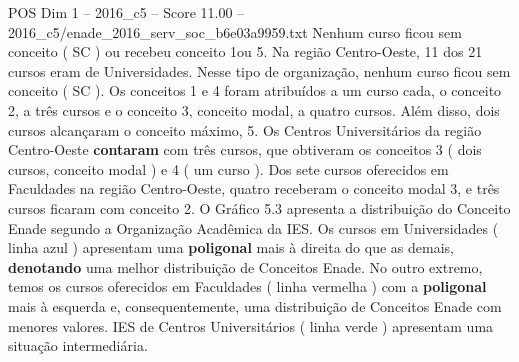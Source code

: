 \begin{textsample}{POS Dim 1 – 2016\_c5 – Score 11.00 – 2016\_c5/enade\_2016\_serv\_soc\_b6e03a9959.txt}
Nenhum curso ficou sem conceito ( SC ) ou recebeu conceito 1ou 5.
Na região Centro-Oeste, 11 dos 21 cursos eram de Universidades.
Nesse tipo de organização, nenhum curso ficou sem conceito ( SC ).
Os conceitos 1 e 4 foram atribuídos a um curso cada, o conceito 2, a três cursos e o conceito 3, conceito modal, a quatro cursos.
Além disso, dois cursos alcançaram o conceito máximo, 5.
Os Centros Universitários da região Centro-Oeste \textbf{contaram} com três cursos, que obtiveram os conceitos 3 ( dois cursos, conceito modal ) e 4 ( um curso ).
Dos sete cursos oferecidos em Faculdades na região Centro-Oeste, quatro receberam o conceito modal 3, e três cursos ficaram com conceito 2.
O Gráfico 5.3 apresenta a distribuição do Conceito Enade segundo a Organização Acadêmica da IES.
Os cursos em Universidades ( linha azul ) apresentam uma \textbf{poligonal} mais à direita do que as demais, \textbf{denotando} uma melhor distribuição de Conceitos Enade.
No outro extremo, temos os cursos oferecidos em Faculdades ( linha vermelha ) com a \textbf{poligonal} mais à esquerda e, consequentemente, uma distribuição de Conceitos Enade com menores valores.
IES de Centros Universitários ( linha verde ) apresentam uma situação intermediária.

\end{textsample}
